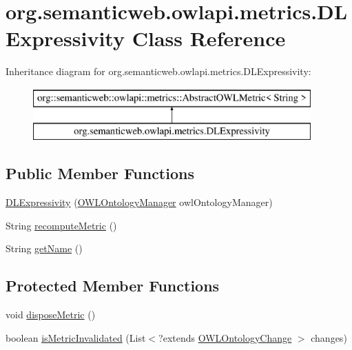 \hypertarget{classorg_1_1semanticweb_1_1owlapi_1_1metrics_1_1_d_l_expressivity}{\section{org.\-semanticweb.\-owlapi.\-metrics.\-D\-L\-Expressivity Class Reference}
\label{classorg_1_1semanticweb_1_1owlapi_1_1metrics_1_1_d_l_expressivity}
}
Inheritance diagram for org.\-semanticweb.\-owlapi.\-metrics.\-D\-L\-Expressivity\-:\begin{figure}[H]
\begin{center}
\leavevmode
\includegraphics[height=2.000000cm]{classorg_1_1semanticweb_1_1owlapi_1_1metrics_1_1_d_l_expressivity}
\end{center}
\end{figure}
\subsection*{Public Member Functions}
\begin{DoxyCompactItemize}
\item 
\hyperlink{classorg_1_1semanticweb_1_1owlapi_1_1metrics_1_1_d_l_expressivity_aa2941e8889a91e02cde75dbe1e719175}{D\-L\-Expressivity} (\hyperlink{interfaceorg_1_1semanticweb_1_1owlapi_1_1model_1_1_o_w_l_ontology_manager}{O\-W\-L\-Ontology\-Manager} owl\-Ontology\-Manager)
\item 
String \hyperlink{classorg_1_1semanticweb_1_1owlapi_1_1metrics_1_1_d_l_expressivity_afed33d1a90336ef6bc51d9e3d0c2f26b}{recompute\-Metric} ()
\item 
String \hyperlink{classorg_1_1semanticweb_1_1owlapi_1_1metrics_1_1_d_l_expressivity_ae96f080a71a4a953db63c9df1fc43a90}{get\-Name} ()
\end{DoxyCompactItemize}
\subsection*{Protected Member Functions}
\begin{DoxyCompactItemize}
\item 
void \hyperlink{classorg_1_1semanticweb_1_1owlapi_1_1metrics_1_1_d_l_expressivity_acfa5db7c2483252d982dda4a66cf3ffb}{dispose\-Metric} ()
\item 
boolean \hyperlink{classorg_1_1semanticweb_1_1owlapi_1_1metrics_1_1_d_l_expressivity_a69a43c43dafb72d0b8c70a218d2f9d2b}{is\-Metric\-Invalidated} (List$<$?extends \hyperlink{classorg_1_1semanticweb_1_1owlapi_1_1model_1_1_o_w_l_ontology_change}{O\-W\-L\-Ontology\-Change} $>$ changes)
\end{DoxyCompactItemize}


